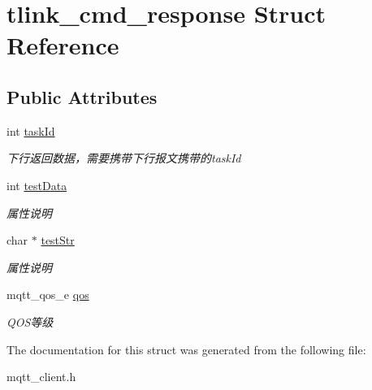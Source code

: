 \hypertarget{structtlink__cmd__response}{}\section{tlink\+\_\+cmd\+\_\+response Struct Reference}
\label{structtlink__cmd__response}
\subsection*{Public Attributes}
\begin{DoxyCompactItemize}
\item 
\mbox{\label{structtlink__cmd__response_a45f95a0d884e19a02e76a35ef76b17da}} 
int \mbox{\hyperlink{structtlink__cmd__response_a45f95a0d884e19a02e76a35ef76b17da}{task\+Id}}
\begin{DoxyCompactList}\small\item\em 下行返回数据，需要携带下行报文携带的task\+Id \end{DoxyCompactList}\item 
\mbox{\label{structtlink__cmd__response_aceb94b1c5fb4dd1b11aa02fc1b4cf859}} 
int \mbox{\hyperlink{structtlink__cmd__response_aceb94b1c5fb4dd1b11aa02fc1b4cf859}{test\+Data}}
\begin{DoxyCompactList}\small\item\em 属性说明 \end{DoxyCompactList}\item 
\mbox{\label{structtlink__cmd__response_a4c5af7c6262000aac923918afaf1504a}} 
char $\ast$ \mbox{\hyperlink{structtlink__cmd__response_a4c5af7c6262000aac923918afaf1504a}{test\+Str}}
\begin{DoxyCompactList}\small\item\em 属性说明 \end{DoxyCompactList}\item 
\mbox{\label{structtlink__cmd__response_abf46af23ace979e82f289b5309031cfa}} 
mqtt\+\_\+qos\+\_\+e \mbox{\hyperlink{structtlink__cmd__response_abf46af23ace979e82f289b5309031cfa}{qos}}
\begin{DoxyCompactList}\small\item\em Q\+O\+S等级 \end{DoxyCompactList}\end{DoxyCompactItemize}


The documentation for this struct was generated from the following file\+:\begin{DoxyCompactItemize}
\item 
mqtt\+\_\+client.\+h\end{DoxyCompactItemize}
